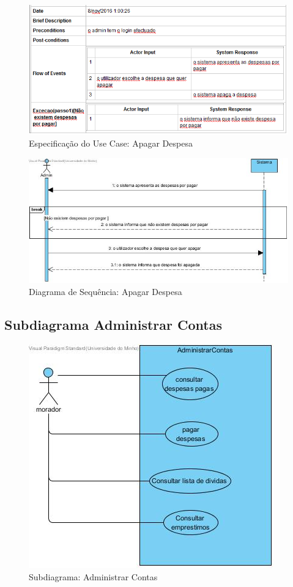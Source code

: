 \begin{figure}[htb!]
	\centering
	\includegraphics[scale=0.6]{imagens/Especificacoes/apagardespesa}  
	\caption{Especificação do Use Case: Apagar Despesa}  
\end{figure}

\begin{figure}[htb!]
	\centering
	\includegraphics[scale=0.5]{imagens/diagramaSeq/ApagarDespesa}  
	\caption{Diagrama de Sequência: Apagar Despesa}  
\end{figure}

\newpage
\subsection{Subdiagrama Administrar Contas}
\begin{figure}[htb!]
	\centering
	\includegraphics[scale=0.6]{imagens/UseCase/despesasMorador}  
	\caption{Subdiagrama: Administrar Contas }  
\end{figure}



